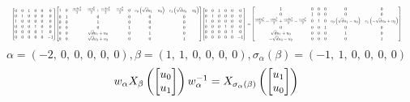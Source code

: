\documentclass[11pt]{article}
\theoremstyle{definition}
\begin{document}
\[
\scaletoalign{\textwidth}{{\left[\begin{matrix}0 & 0 & 1 & 0 & 0 & 0\\0 & 1 & 0 & 0 & 0 & 0\\1 & 0 & 0 & 0 & 0 & 0\\0 & 0 & 0 & 1 & 0 & 0\\0 & 0 & 0 & 0 & 1 & 0\\0 & 0 & 0 & 0 & 0 & -1\end{matrix}\right]} {\left[\begin{matrix}1 & 0 & \frac{c_{0} d u_{1}^{2}}{2} - \frac{c_{0} u_{0}^{2}}{2} + \frac{c_{1} d u_{3}^{2}}{2} - \frac{c_{1} u_{2}^{2}}{2} & 0 & c_{0} \left(\sqrt{d} u_{1} - u_{0}\right) & c_{1} \left(\sqrt{d} u_{3} - u_{2}\right)\\0 & 1 & 0 & 0 & 0 & 0\\0 & 0 & 1 & 0 & 0 & 0\\0 & 0 & 0 & 1 & 0 & 0\\0 & 0 & \sqrt{d} u_{1} + u_{0} & 0 & 1 & 0\\0 & 0 & \sqrt{d} u_{3} + u_{2} & 0 & 0 & 1\end{matrix}\right]} {\left[\begin{matrix}0 & 0 & 1 & 0 & 0 & 0\\0 & 1 & 0 & 0 & 0 & 0\\1 & 0 & 0 & 0 & 0 & 0\\0 & 0 & 0 & 1 & 0 & 0\\0 & 0 & 0 & 0 & 1 & 0\\0 & 0 & 0 & 0 & 0 & -1\end{matrix}\right]} = {\left[\begin{matrix}1 & 0 & 0 & 0 & 0 & 0\\0 & 1 & 0 & 0 & 0 & 0\\\frac{c_{0} d u_{1}^{2}}{2} - \frac{c_{0} u_{0}^{2}}{2} + \frac{c_{1} d u_{3}^{2}}{2} - \frac{c_{1} u_{2}^{2}}{2} & 0 & 1 & 0 & c_{0} \left(\sqrt{d} u_{1} - u_{0}\right) & c_{1} \left(- \sqrt{d} u_{3} + u_{2}\right)\\0 & 0 & 0 & 1 & 0 & 0\\\sqrt{d} u_{1} + u_{0} & 0 & 0 & 0 & 1 & 0\\- \sqrt{d} u_{3} - u_{2} & 0 & 0 & 0 & 0 & 1\end{matrix}\right]}}
\]
\[
\alpha = \left( -2, \  0, \  0, \  0, \  0, \  0\right), \beta = \left( 1, \  1, \  0, \  0, \  0, \  0\right), \sigma_{\alpha}(\beta) = \left( -1, \  1, \  0, \  0, \  0, \  0\right)
\]
\[
\scaletoalign{\textwidth}{w_{\alpha} X_{\beta}\left(\left[\begin{matrix}u_{0}\\u_{1}\end{matrix}\right]\right) w_{\alpha}^{-1} = X_{\sigma_{\alpha}\left(\beta\right)}\left(\left[\begin{matrix}u_{1}\\u_{0}\end{matrix}\right]\right)}
\]
\end{document}
